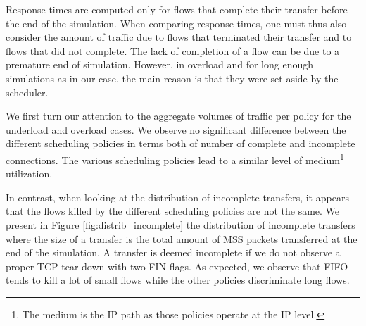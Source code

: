 \documentclass[preprint,12pt]{elsarticle}
\begin{document}
Response times are computed only for flows that complete their transfer before the end of the simulation. When comparing response times, one must thus also consider the amount of traffic due to flows that terminated their transfer and to flows that did not complete. The lack of completion of a flow can be due to a premature end of simulation. However, in overload and for long enough simulations as in our case, the main reason is that they were set aside by the scheduler. %

We first turn our attention to the aggregate volumes of traffic per policy for the underload and overload cases. We observe no significant difference between the different scheduling policies in terms both of number of complete and incomplete connections. The various scheduling policies lead to a similar level of medium\footnote{The medium is the IP path as those policies operate at the IP level.} utilization. 


In contrast, when looking at the distribution of incomplete transfers, it appears that the flows killed by the different scheduling policies are not the same. We present in Figure \ref{fig:distrib_incomplete} the distribution of incomplete transfers where the size of a transfer is the total amount of MSS packets transferred at the end of the simulation. A transfer is deemed incomplete if we do not observe a proper TCP tear down with two FIN flags. As expected, we observe that FIFO tends to kill a lot of small flows while the other policies discriminate long flows.
\end{document}
